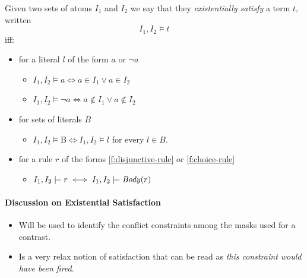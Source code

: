 \begin{definition}
  Given two sets of atoms $I_1$ and $I_2$ we say that they \emph{existentially satisfy} a term $t$, written
  \[ I_1,I_2 \models t \]
  iff:
  \begin{itemize}
    \item for a literal $l$ of the form $a$ or $\neg a$
    \begin{itemize}
      \item $I_1,I_2 \models a \iff a \in I_1 \vee a \in I_2$
      \item $I_1,I_2 \models \neg a \iff a \notin I_1 \vee a \notin I_2$
    \end{itemize}
    \item for sets of literals $B$
    \begin{itemize}
      \item $I_1,I_2 \models $B$ \iff I_1,I_2 \models l$ for every $l \in B$.
    \end{itemize}
    \item for a rule $r$ of the forms \eqref{f:disjunctive-rule} or \eqref{f:choice-rule}
    \begin{itemize}
      \item $I_1,I_2 \models r \iff I_1,I_2 \models \mathit{Body}(r)$
    \end{itemize}
  \end{itemize}
\end{definition}

\paragraph{Discussion on Existential Satisfaction}
\begin{itemize}
  \item Will be used to identify the conflict constraints among the masks used for a contrast.
  \item Is a very relax notion of satisfaction that can be read as \emph{this constraint would have been fired}.
\end{itemize}

